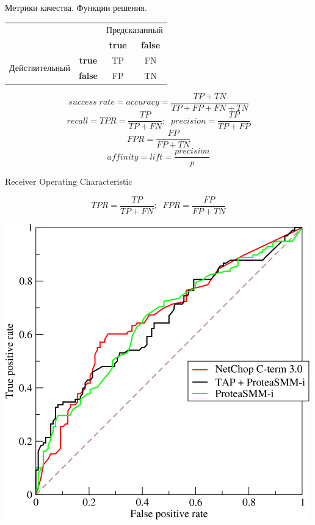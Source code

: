 \documentclass[aspectratio=169]{beamer}
\begin{document}
\begin{frame}{Метрики качества. Функции решения.}

\begin{center}
\begin{tabular}{|c r | c c|}
\cline{3-4}
 \multicolumn{2}{c|}{} & \multicolumn{2}{c|}{Предсказанный} \\
 \cline{3-4}
 \multicolumn{2}{c|}{} & {\bf true} & {\bf false} \\
 \hline
 \multirow{2}{*}{Действительный} & \multicolumn{1}{|c|}{\bf true} & TP & FN \\
 & \multicolumn{1}{|c|}{\bf false}  & FP & TN \\
 \hline
\end{tabular}
\end{center}

\[
success\;rate = accuracy = \frac{TP + TN}{TP + FP + FN + TN}
\]
\[
recall = TPR = \frac{TP}{TP + FN};\;\;precision = \frac{TP}{TP + FP}
\]
\[
FPR = \frac{FP}{FP + TN}
\]
\[
affinity = lift = \frac{precision}{p}
\]

\end{frame}

\begin{frame}{Receiver Operating Characteristic}

\[
TPR = \frac{TP}{TP + FN};\;\;FPR = \frac{FP}{FP + TN}
\]

\begin{center}
\includegraphics[scale=2.0]{images/roc.png}
\end{center}

\end{frame}
\end{document}
